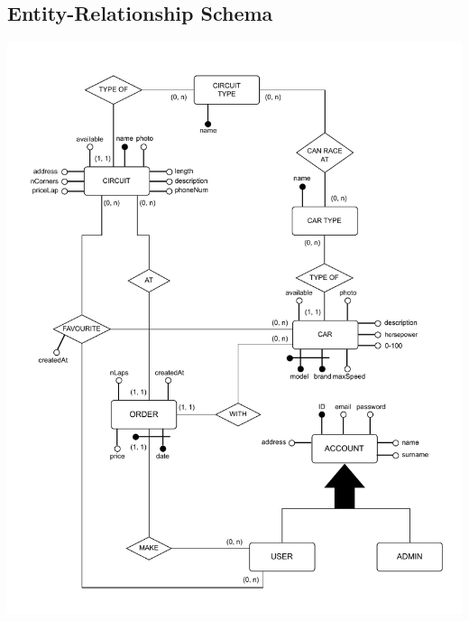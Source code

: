 \subsection{Entity-Relationship Schema}

\begin{center}
	\includegraphics[scale=0.55]{ERSchema.pdf}
	\label{ERSchema}
\end{center}

